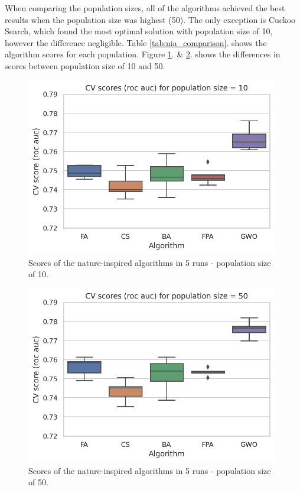 \documentclass[runningheads]{llncs}
\begin{document}
When comparing the population sizes, all of the algorithms achieved the best results when the population size was highest (50). The only exception is Cuckoo Search, which found the most optimal solution with population size of 10, however the difference negligible. Table \ref{tab:nia_comparison}. shows the algorithm scores for each population. Figure \ref{fig:nia_train_score_by_algorithm_1}. \& \ref{fig:nia_train_score_by_algorithm_2}. shows the differences in scores between population size of 10 and 50.


\begin{figure}
    \centering
    \includegraphics[width=11cm]{figures/nia_train_score_by_algorithm_10}
    \caption{Scores of the nature-inspired algorithms in 5 runs - population size of 10.}
    \label{fig:nia_train_score_by_algorithm_1}
\end{figure}

\begin{figure}
    \centering
    \includegraphics[width=11cm]{figures/nia_train_score_by_algorithm_50}
    \caption{Scores of the nature-inspired algorithms in 5 runs - population size of 50.}
    \label{fig:nia_train_score_by_algorithm_2}
\end{figure}
\end{document}
